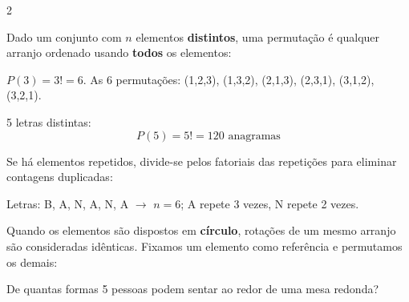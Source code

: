 \documentclass[12pt]{article}
\begin{document}
\begin{multicols}{2}

Dado um conjunto com $n$ elementos \textbf{distintos}, uma permutação
é qualquer arranjo ordenado usando \textbf{todos} os elementos:




$P(3) = 3! = 6$. As 6 permutações:
(1,2,3), (1,3,2), (2,1,3), (2,3,1), (3,1,2), (3,2,1).


5 letras distintas:
$$P(5) = 5! = 120 \text{ anagramas}$$


Se há elementos repetidos, divide-se pelos fatoriais das repetições
para eliminar contagens duplicadas:



Letras: B, A, N, A, N, A $\to$ $n=6$;
A repete 3 vezes, N repete 2 vezes.




Quando os elementos são dispostos em \textbf{círculo}, rotações de um
mesmo arranjo são consideradas idênticas. Fixamos um elemento como
referência e permutamos os demais:



De quantas formas 5 pessoas podem sentar ao redor de uma mesa redonda?



\end{multicols}
\end{document}
